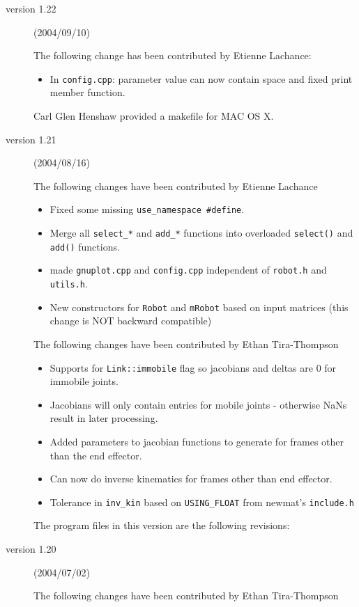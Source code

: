 \documentclass[dvips,11pt,fleqn]{report}
\begin{document}
\begin{description}
\item[version 1.22] (2004/09/10) 

  The following change has been contributed by Etienne Lachance:
  \begin{itemize}
  \item In \texttt{config.cpp}: parameter value can now contain space
    and fixed print member function.
  \end{itemize}
  Carl Glen Henshaw provided a makefile for MAC OS X.

\item[version 1.21] (2004/08/16) 

  The following changes have been contributed by Etienne Lachance
  \begin{itemize}
  \item Fixed some missing \texttt{use\_namespace \#define}.
  \item Merge all \texttt{select\_*} and \texttt{add\_*} functions
    into overloaded \texttt{select()} and \texttt{add()} functions.
  \item made \texttt{gnuplot.cpp} and \texttt{config.cpp} independent
    of \texttt{robot.h} and \texttt{utils.h}.
  \item New constructors for \texttt{Robot} and \texttt{mRobot} based
    on input matrices (this change is NOT backward compatible)
  \end{itemize}
  The following changes have been contributed by Ethan Tira-Thompson
  \begin{itemize}
  \item Supports for \texttt{Link::immobile} flag so jacobians and
    deltas are 0 for immobile joints.
  \item Jacobians will only contain entries for mobile joints -
    otherwise NaNs result in later processing.
  \item Added parameters to jacobian functions to generate for frames
    other than the end effector.
  \item Can now do inverse kinematics for frames other than end
    effector.
  \item Tolerance in \texttt{inv\_kin} based on \texttt{USING\_FLOAT}
    from newmat's \texttt{include.h}
  \end{itemize}
  The program files in this version are the following revisions:

\item[version 1.20] (2004/07/02) 

  The following changes have been contributed by Ethan Tira-Thompson


\end{description}
\end{document}
